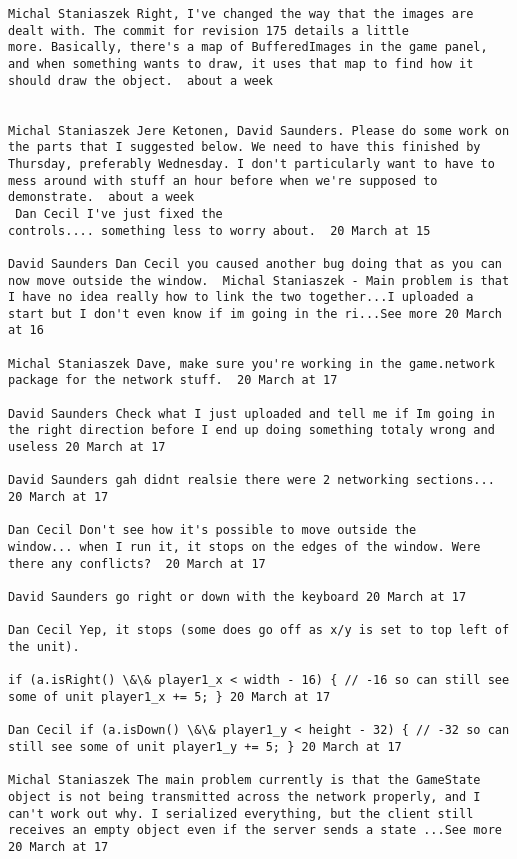 \begin{verbatim}
Michal Staniaszek Right, I've changed the way that the images are
dealt with. The commit for revision 175 details a little
more. Basically, there's a map of BufferedImages in the game panel,
and when something wants to draw, it uses that map to find how it
should draw the object.  about a week 


Michal Staniaszek Jere Ketonen, David Saunders. Please do some work on
the parts that I suggested below. We need to have this finished by
Thursday, preferably Wednesday. I don't particularly want to have to
mess around with stuff an hour before when we're supposed to
demonstrate.  about a week 
 Dan Cecil I've just fixed the
controls.... something less to worry about.  20 March at 15

David Saunders ‎Dan Cecil you caused another bug doing that as you can
now move outside the window.  Michal Staniaszek - Main problem is that
I have no idea really how to link the two together...I uploaded a
start but I don't even know if im going in the ri...See more 20 March
at 16

Michal Staniaszek Dave, make sure you're working in the game.network
package for the network stuff.  20 March at 17

David Saunders Check what I just uploaded and tell me if Im going in
the right direction before I end up doing something totaly wrong and
useless 20 March at 17

David Saunders gah didnt realsie there were 2 networking sections...
20 March at 17

Dan Cecil Don't see how it's possible to move outside the
window... when I run it, it stops on the edges of the window. Were
there any conflicts?  20 March at 17

David Saunders go right or down with the keyboard 20 March at 17

Dan Cecil Yep, it stops (some does go off as x/y is set to top left of
the unit).

if (a.isRight() \&\& player1_x < width - 16) { // -16 so can still see
some of unit player1_x += 5; } 20 March at 17

Dan Cecil if (a.isDown() \&\& player1_y < height - 32) { // -32 so can
still see some of unit player1_y += 5; } 20 March at 17

Michal Staniaszek The main problem currently is that the GameState
object is not being transmitted across the network properly, and I
can't work out why. I serialized everything, but the client still
receives an empty object even if the server sends a state ...See more
20 March at 17


\end{verbatim}
